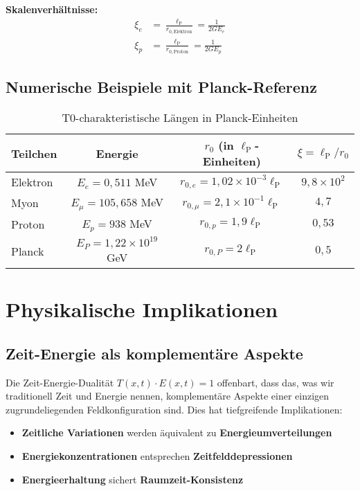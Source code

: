 \documentclass[12pt,a4paper]{report}
\newcommand{\lP}{\ell_{\text{P}}}         %
\newcommand{\rzero}{r_0}                  %
\begin{document}
	\textbf{Skalenverhältnisse:}
	\begin{align}
		\xi_{e} &= \frac{\lP}{r_{0,\text{Elektron}}} = \frac{1}{2GE_e} \\
		\xi_{p} &= \frac{\lP}{r_{0,\text{Proton}}} = \frac{1}{2GE_p}
	\end{align}
	
	\subsection{Numerische Beispiele mit Planck-Referenz}\label{subsec:numerical_examples}
	
	\begin{table}[htbp]
		\centering
		\begin{tabular}{lccc}
			\toprule
			\textbf{Teilchen} & \textbf{Energie} & \textbf{$\rzero$ (in $\lP$-Einheiten)} & \textbf{$\xi = \lP/\rzero$} \\
			\midrule
			Elektron & $E_e = 0,511$ MeV & $r_{0,e} = 1,02 \times 10^{-3} \lP$ & $9,8 \times 10^{2}$ \\
			Myon & $E_\mu = 105,658$ MeV & $r_{0,\mu} = 2,1 \times 10^{-1} \lP$ & $4,7$ \\
			Proton & $E_p = 938$ MeV & $r_{0,p} = 1,9 \lP$ & $0,53$ \\
			Planck & $E_P = 1,22 \times 10^{19}$ GeV & $r_{0,P} = 2\lP$ & $0,5$ \\
			\bottomrule
		\end{tabular}
		\caption{T0-charakteristische Längen in Planck-Einheiten}
		\label{tab:t0_scales_planck}
	\end{table}
	
	\section{Physikalische Implikationen}\label{sec:physical_implications}
	
	\subsection{Zeit-Energie als komplementäre Aspekte}\label{subsec:complementary_aspects}
	
	Die Zeit-Energie-Dualität $T(x,t) \cdot E(x,t) = 1$ offenbart, dass das, was wir traditionell Zeit und Energie nennen, komplementäre Aspekte einer einzigen zugrundeliegenden Feldkonfiguration sind. Dies hat tiefgreifende Implikationen:
	
	\begin{itemize}
		\item \textbf{Zeitliche Variationen} werden äquivalent zu \textbf{Energieumverteilungen}
		\item \textbf{Energiekonzentrationen} entsprechen \textbf{Zeitfelddepressionen}
		\item \textbf{Energieerhaltung} sichert \textbf{Raumzeit-Konsistenz}
	\end{itemize}
	
\end{document}
